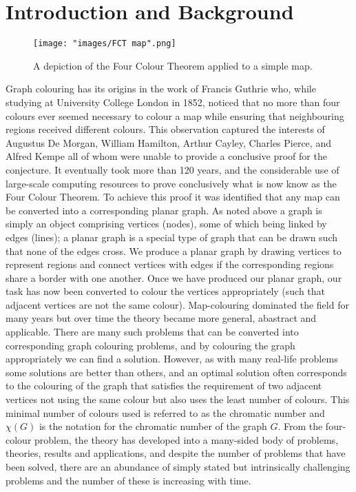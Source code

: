 \documentclass[12pt, a4paper]{article}
\begin{document}
\section*{Introduction and Background}
\begin{wrapfigure}{r}{0.45\textwidth}
\texttt{[image: "images/FCT map".png]}
\caption*{A depiction of the Four Colour Theorem applied to a simple map.}
\end{wrapfigure}
\hspace{\parindent}Graph colouring has its origins in the work of Francis Guthrie who, while studying at University College London in 1852, noticed that no more than four colours ever seemed necessary to colour a map while ensuring that neighbouring regions received different colours. This observation captured the interests of Augustus De Morgan, William Hamilton, Arthur Cayley, Charles Pierce, and Alfred Kempe all of whom were unable to provide a conclusive proof for the conjecture. It eventually took more than 120 years, and the considerable use of large-scale computing resources to prove conclusively what is now know as the Four Colour Theorem. To achieve this proof it was identified that any map can be converted into a corresponding planar graph. As noted above a graph is simply an object comprising vertices (nodes), some of which being linked by edges (lines); a planar graph is a special type of graph that can be drawn such that none of the edges cross. We produce a planar graph by drawing vertices to represent regions and connect vertices with edges if the corresponding regions share a border with one another. Once we have produced our planar graph, our task has now been converted to colour the vertices appropriately (such that adjacent vertices are not the same colour). Map-colouring dominated the field for many years but over time the theory became more general, abastract and applicable. There are many such problems that can be converted into corresponding graph colouring problems, and by colouring the graph appropriately we can find a solution. However, as with many real-life problems some solutions are better than others, and an optimal solution often corresponds to the colouring of the graph that satisfies the requirement of two adjacent vertices not using the same colour but also uses the least number of colours. This minimal number of colours used is referred to as the chromatic number and $\chi(G)$ is the notation for the chromatic number of the graph $G$. From the four-colour problem, the theory has developed into a many-sided body of problems, theories, results and applications, and despite the number of problems that have been solved, there are an abundance of simply stated but intrinsically challenging problems and the number of these is increasing with time.
\end{document}
